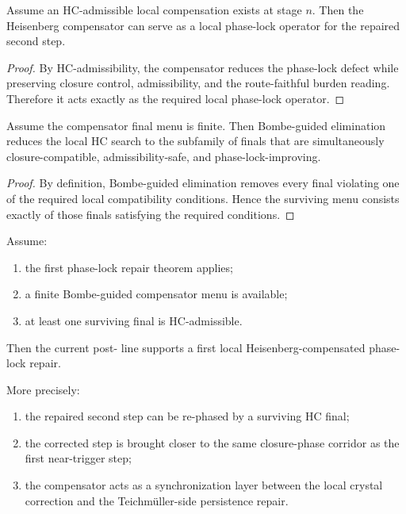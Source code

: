 \begin{proposition}
\label{prop:hc-can-serve-as-local-phase-lock-operator}
Assume an HC-admissible local compensation exists at stage $n$. Then the Heisenberg compensator can serve as a local phase-lock operator for the repaired second step.
\end{proposition}

\begin{proof}
By HC-admissibility, the compensator reduces the phase-lock defect while preserving closure control, admissibility, and the route-faithful burden reading. Therefore it acts exactly as the required local phase-lock operator.
\end{proof}

\begin{lemma}
\label{lem:bombe-guided-hc-elimination-lemma}
Assume the compensator final menu is finite. Then Bombe-guided elimination reduces the local HC search to the subfamily of finals that are simultaneously closure-compatible, admissibility-safe, and phase-lock-improving.
\end{lemma}

\begin{proof}
By definition, Bombe-guided elimination removes every final violating one of the required local compatibility conditions. Hence the surviving menu consists exactly of those finals satisfying the required conditions.
\end{proof}

\begin{theorem}
\label{thm:first-local-heisenberg-compensator-theorem}
Assume:
\begin{enumerate}[leftmargin=2em,label=(\alph*)]
 \item the first phase-lock repair theorem applies;
 \item a finite Bombe-guided compensator menu is available;
 \item at least one surviving final is HC-admissible.
\end{enumerate}
Then the current post- line supports a first local Heisenberg-compensated phase-lock repair.

More precisely:
\begin{enumerate}[leftmargin=2em,label=(\roman*)]
 \item the repaired second step can be re-phased by a surviving HC final;
 \item the corrected step is brought closer to the same closure-phase corridor as the first near-trigger step;
 \item the compensator acts as a synchronization layer between the local crystal correction and the Teichm\"uller-side persistence repair.
\end{enumerate}
\end{theorem}

